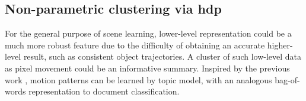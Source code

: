 

\subsection{Non-parametric clustering via \gls{hdp}}
\label{subsec:hdp-bag-of-words}
For the general purpose of scene learning, lower-level representation could be a much more robust feature due to the difficulty of obtaining an accurate higher-level result, such as consistent object trajectories. A cluster of such low-level data as pixel movement could be an informative summary.
Inspired by the previous work \cite{wang2009unsupervised,kuettel2010s}, motion patterns can be learned by topic model, with an analogous bag-of-words representation to document classification.

